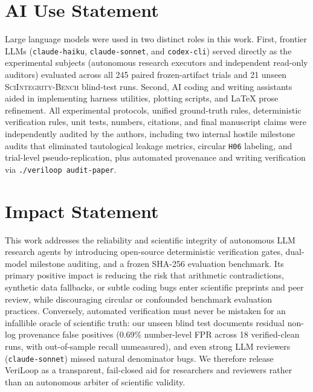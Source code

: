\section*{AI Use Statement}
Large language models were used in two distinct roles in this work.
First, frontier LLMs (\texttt{claude-haiku}, \texttt{claude-sonnet}, and \texttt{codex-cli}) served directly as the experimental subjects (autonomous research executors and independent read-only auditors) evaluated across all 245 paired frozen-artifact trials and 21 unseen \textsc{SciIntegrity-Bench} blind-test runs.
Second, AI coding and writing assistants aided in implementing harness utilities, plotting scripts, and LaTeX prose refinement.
All experimental protocols, unified ground-truth rules, deterministic verification rules, unit tests, numbers, citations, and final manuscript claims were independently audited by the authors, including two internal hostile milestone audits that eliminated tautological leakage metrics, circular \texttt{H06} labeling, and trial-level pseudo-replication, plus automated provenance and writing verification via \texttt{./veriloop audit-paper}.

\section*{Impact Statement}
This work addresses the reliability and scientific integrity of autonomous LLM research agents by introducing open-source deterministic verification gates, dual-model milestone auditing, and a frozen SHA-256 evaluation benchmark.
Its primary positive impact is reducing the risk that arithmetic contradictions, synthetic data fallbacks, or subtle coding bugs enter scientific preprints and peer review, while discouraging circular or confounded benchmark evaluation practices.
Conversely, automated verification must never be mistaken for an infallible oracle of scientific truth: our unseen blind test documents residual non-log provenance false positives (0.69\% number-level FPR across 18 verified-clean runs, with out-of-sample recall unmeasured), and even strong LLM reviewers (\texttt{claude-sonnet}) missed natural denominator bugs.
We therefore release VeriLoop as a transparent, fail-closed aid for researchers and reviewers rather than an autonomous arbiter of scientific validity.

